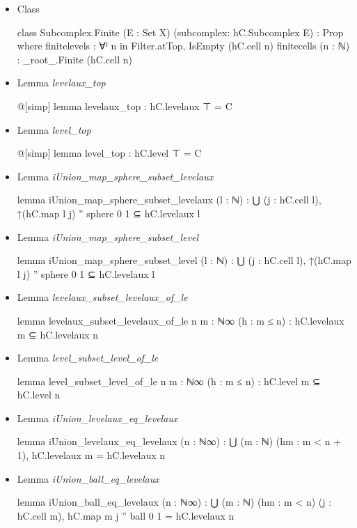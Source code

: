 \documentclass[colorinlistoftodos]{article}
\newcommand{\todonoturgent}[1]{\todo[color=yellow]{#1}}
\begin{document}
\begin{itemize}
  \item Class 
\begin{leancode}
class Subcomplex.Finite (E : Set X) (subcomplex: hC.Subcomplex E) : Prop where
  finitelevels : ∀ᶠ n in Filter.atTop, IsEmpty (hC.cell n)
  finitecells (n : ℕ) : _root_.Finite (hC.cell n)
\end{leancode}
  \item Lemma \emph{levelaux\_top}
\begin{leancode}
@[simp] lemma levelaux_top : hC.levelaux ⊤ = C
\end{leancode}
  \item Lemma \emph{level\_top}
\begin{leancode}
@[simp] lemma level_top : hC.level ⊤ = C
\end{leancode}
  \item Lemma \emph{iUnion\_map\_sphere\_subset\_levelaux}
\begin{leancode}
lemma iUnion_map_sphere_subset_levelaux (l : ℕ) : 
  ⋃ (j : hC.cell l), ↑(hC.map l j) '' sphere 0 1 ⊆ hC.levelaux l
\end{leancode}
  \item Lemma \emph{iUnion\_map\_sphere\_subset\_level}
\begin{leancode}
lemma iUnion_map_sphere_subset_level (l : ℕ) :
  ⋃ (j : hC.cell l), ↑(hC.map l j) '' sphere 0 1 ⊆ hC.levelaux l
\end{leancode}
  \item Lemma \emph{levelaux\_subset\_levelaux\_of\_le}
\begin{leancode}
lemma levelaux_subset_levelaux_of_le {n m : ℕ∞} (h : m ≤ n) :
  hC.levelaux m ⊆ hC.levelaux n
\end{leancode}
  \item Lemma \emph{level\_subset\_level\_of\_le}
\begin{leancode}
lemma level_subset_level_of_le {n m : ℕ∞} (h : m ≤ n) : hC.level m ⊆ hC.level n
\end{leancode}
  \item Lemma \emph{iUnion\_levelaux\_eq\_levelaux}
\begin{leancode}
lemma iUnion_levelaux_eq_levelaux (n : ℕ∞) : 
  ⋃ (m : ℕ) (hm : m < n + 1), hC.levelaux m = hC.levelaux n
\end{leancode}
  \item Lemma \emph{iUnion\_ball\_eq\_levelaux} \todonoturgent{Extraxt lemma (marked in code)}
\begin{leancode}
lemma iUnion_ball_eq_levelaux (n : ℕ∞) :
  ⋃ (m : ℕ) (hm : m < n) (j : hC.cell m), hC.map m j '' ball 0 1 = hC.levelaux n

\end{leancode}
\end{itemize}
\end{document}
